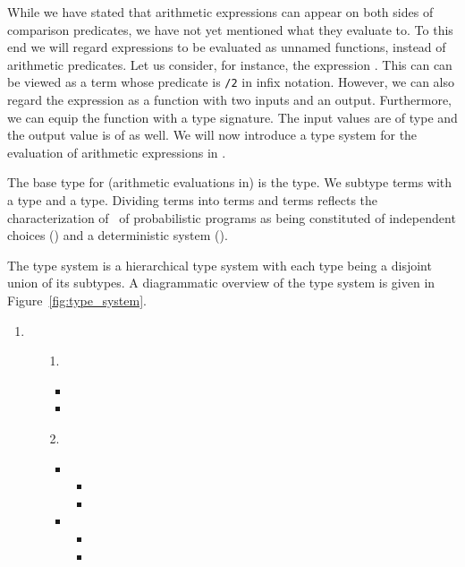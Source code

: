 While we have stated that arithmetic expressions can appear on both sides of comparison predicates, we have not yet mentioned what they evaluate to.
To this end we will regard expressions to be evaluated as unnamed functions, instead of arithmetic predicates. Let us consider, for instance, the expression . This can can be viewed as a term whose predicate is \probloginline{+}\lstinline[columns=fixed]|/2| in infix notation. However, we can also regard the expression as a function with two inputs and an output. Furthermore, we can equip the function with a type signature. The input values are of type  and the output value is of  as well. We will now introduce a type system for the evaluation of arithmetic expressions in \dcproblogsty.

The base type for (arithmetic evaluations in) \dcproblogsty is the  type. We subtype terms with a  type and a  type. 
Dividing \dcproblogsty terms into \justify{} terms and  terms reflects the characterization of~\citet{poole2010probabilistic} of probabilistic programs as being constituted of independent choices () and a deterministic system ().

\begin{definition}\label{def:type_system}
	The \dcproblogsty type system is a hierarchical type system with each type being a disjoint union of its subtypes. A diagrammatic overview of the \dcproblogsty type system is given in Figure~\ref{fig:type_system}.
	\begin{enumerate}
		\item[]  
		\begin{enumerate}
			\item[1.] 
			\begin{itemize}
				\item {}
				\item {}
			\end{itemize}
			\item[2.] 
			\begin{itemize}		
				\item {}
				\begin{itemize}
				    \item {}
				    \item {}
				\end{itemize}
				\item {}
				\begin{itemize}
				    \item {}
				    \item {}
				\end{itemize}	
			\end{itemize}
		\end{enumerate}
	\end{enumerate}
\end{definition}



